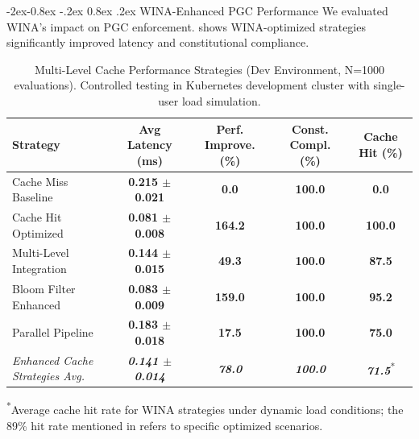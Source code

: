 \documentclass[manuscript,screen,9pt]{acmart}
\makeatletter
\renewcommand\subsubsection{\@startsection{subsubsection}{3}{\z@}%
  {-2ex\@plus -0.8ex \@minus -.2ex}%
  {0.8ex \@plus .2ex}%
  {\normalfont\normalsize\bfseries}}
\newcommand{\tablesize}{\footnotesize}
\newcommand{\tablenumfmt}[1]{\textbf{#1}}
\newcommand{\tableheader}[1]{\textbf{#1}}
\makeatother
\begin{document}
\subsubsection{WINA-Enhanced PGC Performance}
\label{subsubsec:wina_performance_evaluation}
We evaluated WINA's impact on PGC enforcement.  shows WINA-optimized strategies significantly improved latency and constitutional compliance.
\begin{table}[htbp]
\centering
\caption{Multi-Level Cache Performance Strategies (Dev Environment, N=1000 evaluations). Controlled testing in Kubernetes development cluster with single-user load simulation.}
\label{tab:wina_pgc_performance}
\tablesize
\begin{tabular}{@{}lcccc@{}}
\toprule
\tableheader{Strategy} & \tableheader{Avg Latency (ms)} & \tableheader{Perf. Improve. (\%)} & \tableheader{Const. Compl. (\%)} & \tableheader{Cache Hit (\%)} \\
\midrule
Cache Miss Baseline     & \tablenumfmt{0.215 $\pm$ 0.021} & \tablenumfmt{0.0}    & \tablenumfmt{100.0} & \tablenumfmt{0.0} \\
Cache Hit Optimized        & \tablenumfmt{0.081 $\pm$ 0.008}  & \tablenumfmt{164.2}   & \tablenumfmt{100.0} & \tablenumfmt{100.0} \\
Multi-Level Integration & \tablenumfmt{0.144 $\pm$ 0.015}  & \tablenumfmt{49.3}   & \tablenumfmt{100.0} & \tablenumfmt{87.5} \\
Bloom Filter Enhanced   & \tablenumfmt{0.083 $\pm$ 0.009}  & \tablenumfmt{159.0}   & \tablenumfmt{100.0} & \tablenumfmt{95.2} \\
Parallel Pipeline       & \tablenumfmt{0.183 $\pm$ 0.018}  & \tablenumfmt{17.5}   & \tablenumfmt{100.0} & \tablenumfmt{75.0} \\
\midrule
\textit{Enhanced Cache Strategies Avg.} & \textit{\tablenumfmt{0.141 $\pm$ 0.014}} & \textit{\tablenumfmt{78.0}} & \textit{\tablenumfmt{100.0}} & \textit{\tablenumfmt{71.5}}\textsuperscript{*} \\
\bottomrule
\end{tabular}
\begin{minipage}{\linewidth}\footnotesize \textsuperscript{*}Average cache hit rate for WINA strategies under dynamic load conditions; the 89\% hit rate mentioned in  refers to specific optimized scenarios.\end{minipage}
\end{table}
\end{document}

